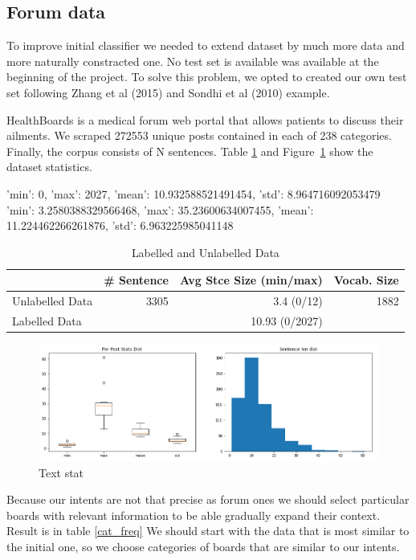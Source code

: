 \documentclass[11pt]{article}
\begin{document}
\subsection{Forum data}

To improve initial classifier we needed to extend dataset by much more data and more naturally constracted one. No  test  set  is  available was available at the beginning of the project. To  solve this  problem,  we  opted  to  created  our  own  test set following Zhang et al (2015) and Sondhi et al (2010) example.  

HealthBoards is a medical forum web portal that allows patients to discuss their ailments.
We scraped 272553 unique posts contained in each of 238 categories. Finally, the corpus consists of N  sentences. Table \ref{tab:datastats} and Figure~\ref{visina8} show the dataset statistics.


{'min': 0, 'max': 2027, 'mean': 10.932588521491454, 'std': 8.964716092053479}
{'min': 3.2580388329566468, 'max': 35.23600634007455, 'mean': 11.224462266261876, 'std': 6.963225985041148}

\begin{table}
\begin{tabular}{ |l|rrr| }
  \hline
   & \# Sentence & Avg Stce Size (min/max) & Vocab. Size\\\hline
  Unlabelled Data & 3305 & 3.4 (0/12) & 1882 \\
  Labelled Data & & 10.93 (0/2027) & \\\hline
\end{tabular}
\caption{Labelled and Unlabelled Data}
\label{tab:datastats}
\end{table}
\FloatBarrier

 \begin{figure}[h]
 	\centering
 	\includegraphics[scale=0.5]{report3.png}
	\caption{Text stat}\label{visina8}
 \end{figure}
\FloatBarrier


Because our intents are not that precise as forum ones we should select particular boards with relevant information to be able gradually expand their context. Result is in table \ref{cat_freq} 
We should start with the data that is most similar to the initial one, so we choose categories of boards that are similar to our intents. 
\end{document}
